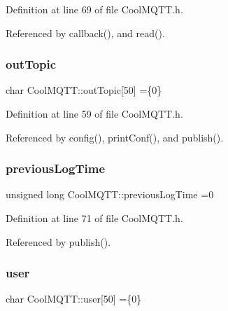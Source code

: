 Definition at line 69 of file Cool\+M\+Q\+T\+T.\+h.



Referenced by callback(), and read().

\mbox{\label{classCoolMQTT_a109c786a17b463f9eeba046194279522}} 
\subsubsection{\texorpdfstring{out\+Topic}{outTopic}}
{\footnotesize\ttfamily char Cool\+M\+Q\+T\+T\+::out\+Topic\mbox{[}50\mbox{]} =\{\textquotesingle{}0\textquotesingle{}\}\hspace{0.3cm}{\ttfamily [private]}}



Definition at line 59 of file Cool\+M\+Q\+T\+T.\+h.



Referenced by config(), print\+Conf(), and publish().

\mbox{\label{classCoolMQTT_a3db37ef9ed3b05b2a8d44edba0e7d3cc}} 
\subsubsection{\texorpdfstring{previous\+Log\+Time}{previousLogTime}}
{\footnotesize\ttfamily unsigned long Cool\+M\+Q\+T\+T\+::previous\+Log\+Time =0\hspace{0.3cm}{\ttfamily [private]}}



Definition at line 71 of file Cool\+M\+Q\+T\+T.\+h.



Referenced by publish().

\mbox{\label{classCoolMQTT_a8cd47e45d457f908d4b4390b35aaee83}} 
\subsubsection{\texorpdfstring{user}{user}}
{\footnotesize\ttfamily char Cool\+M\+Q\+T\+T\+::user\mbox{[}50\mbox{]} =\{\textquotesingle{}0\textquotesingle{}\}\hspace{0.3cm}{\ttfamily [private]}}



